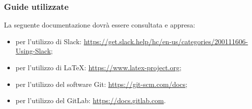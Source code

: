 \subsubsection{Guide utilizzate}
La seguente documentazione dovrà essere consultata e appresa: 
\begin{itemize}
    \item per l'utilizzo di Slack: \url{https://get.slack.help/hc/en-us/categories/200111606-Using-Slack};
    \item per l'utilizzo di LaTeX: \url{https://www.latex-project.org};
    \item per l'utilizzo del software Git: \url{https://git-scm.com/docs};
    \item per l'utilizzo del GitLab: \url{https://docs.gitlab.com}.
\end{itemize}